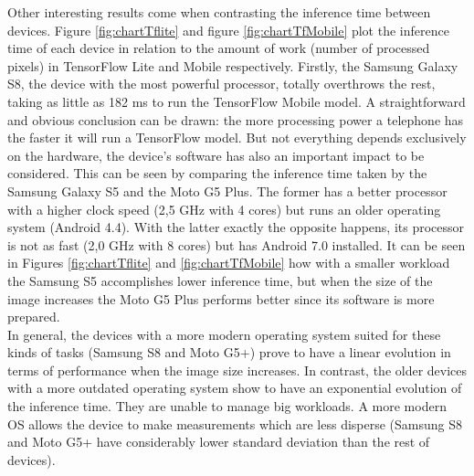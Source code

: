 Other interesting results come when contrasting the inference time between devices. Figure \ref{fig:chartTflite} and figure \ref{fig:chartTfMobile} plot the inference time of each device in relation to the amount of work (number of processed pixels) in TensorFlow Lite and Mobile respectively. Firstly, the Samsung Galaxy S8, the device with the most powerful processor, totally overthrows the rest, taking as little as 182 ms to run the TensorFlow Mobile model. A straightforward and obvious conclusion can be drawn: the more processing power a telephone has the faster it will run a TensorFlow model. But not everything depends exclusively on the hardware, the device's software has also an important impact to be considered. This can be seen by comparing the inference time taken by the Samsung Galaxy S5 and the Moto G5 Plus. The former has a better processor with a higher clock speed (2,5 GHz with 4 cores) but runs an older operating system (Android 4.4). With the latter exactly the opposite happens, its processor is not as fast (2,0 GHz with 8 cores) but has Android 7.0 installed. It can be seen in Figures \ref{fig:chartTflite} and \ref{fig:chartTfMobile} how with a smaller workload the Samsung S5 accomplishes lower inference time, but when the size of the image increases the Moto G5 Plus performs better since its software is more prepared. \\

In general, the devices with a more modern operating system suited for these kinds of tasks (Samsung S8 and Moto G5+) prove to have a linear evolution in terms of performance when the image size increases. In contrast, the older devices with a more outdated operating system show to have an exponential evolution of the inference time. They are unable to manage big workloads. A more modern OS allows the device to make measurements which are less disperse (Samsung S8 and Moto G5+ have considerably lower standard deviation than the rest of devices). \\

